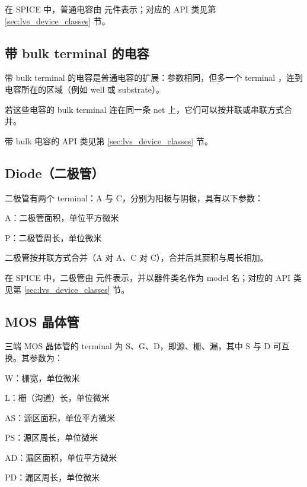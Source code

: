 在 SPICE 中，普通电容由  元件表示；对应的 API 类见第 \ref{sec:lvs_device_classes} 节。

\subsection{带 bulk terminal 的电容}


带 bulk terminal 的电容是普通电容的扩展：参数相同，但多一个 terminal ，连到电容所在的区域（例如 well 或 substrate）。

若这些电容的 bulk terminal 连在同一条 net 上，它们可以按并联或串联方式合并。

带 bulk 电容的 API 类见第 \ref{sec:lvs_device_classes} 节。

\subsection{Diode（二极管）}


二极管有两个 terminal：A 与 C，分别为阳极与阴极，具有以下参数：

\begin{kldesc}
\item A：二极管面积，单位平方微米
\item P：二极管周长，单位微米
\end{kldesc}

二极管按并联方式合并（A 对 A、C 对 C），合并后其面积与周长相加。

在 SPICE 中，二极管由  元件表示，并以器件类名作为 model 名；对应的 API 类见第 \ref{sec:lvs_device_classes} 节。

\subsection{MOS 晶体管}


三端 MOS 晶体管的 terminal 为 S、G、D，即源、栅、漏，其中 S 与 D 可互换。其参数为：

\begin{kldesc}
\item W：栅宽，单位微米
\item L：栅（沟道）长，单位微米
\item AS：源区面积，单位平方微米
\item PS：源区周长，单位微米
\item AD：漏区面积，单位平方微米
\item PD：漏区周长，单位微米
\end{kldesc}


